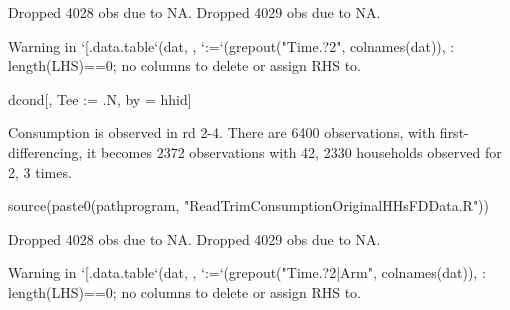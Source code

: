 \begin{Schunk}
\begin{Soutput}
Dropped 4028 obs due to NA.
Dropped 4029 obs due to NA.
\end{Soutput}
\begin{Soutput}
Warning in `[.data.table`(dat, , `:=`(grepout("Time.?2", colnames(dat)), : length(LHS)==0; no columns to delete or assign RHS to.
\end{Soutput}
\begin{Sinput}
dcond[, Tee := .N, by = hhid]
\end{Sinput}
\end{Schunk}

Consumption is observed in rd 2-4. There are 6400 observations, with first-differencing, it becomes 2372 observations with 42, 2330 households observed for 2, 3 times. 

\begin{Schunk}
\begin{Sinput}
source(paste0(pathprogram, "ReadTrimConsumptionOriginalHHsFDData.R"))
\end{Sinput}
\begin{Soutput}
Dropped 4028 obs due to NA.
Dropped 4029 obs due to NA.
\end{Soutput}
\begin{Soutput}
Warning in `[.data.table`(dat, , `:=`(grepout("Time.?2|Arm", colnames(dat)), : length(LHS)==0; no columns to delete or assign RHS to.
\end{Soutput}
\end{Schunk}

